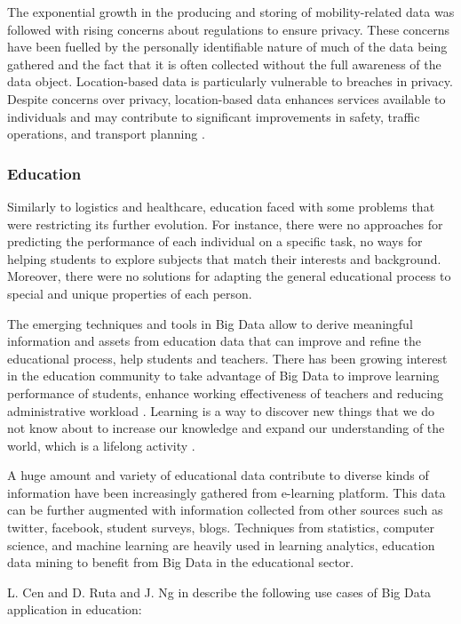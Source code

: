 \documentclass[runningheads]{llncs}
\begin{document}
The exponential growth in the producing and storing of mobility-related data was followed with rising concerns about regulations to ensure privacy. These concerns have been fuelled by the personally identifiable nature of much of the data being gathered and the fact that it is often collected without the full awareness of the data object. Location-based data is particularly vulnerable to breaches in privacy. Despite concerns over privacy, location-based data enhances services available to individuals and may contribute to significant improvements in safety, traffic operations, and transport planning \cite{TRANSPORT}. 

\subsubsection{Education}

Similarly to logistics and healthcare, education faced with some problems that were restricting its further evolution. For instance, there were no approaches for predicting the performance of each individual on a specific task, no ways for helping students to explore subjects that match their interests and background. Moreover, there were no solutions for adapting the general educational process to special and unique properties of each person. 

The emerging techniques and tools in Big Data allow to derive meaningful information and assets from education data that can improve and refine the educational process, help students and teachers. There has been growing interest in the education community to take advantage of Big Data to improve learning performance of
students, enhance working effectiveness of teachers and reducing administrative workload \cite{SHAMRZO}. Learning is a way to discover new things that we do not know about to increase our knowledge and expand our understanding of the world, which is a lifelong activity \cite{BIGEDUCATION}. 

A huge amount and variety of educational data contribute to diverse kinds of information have been increasingly gathered from e-learning platform. This data can be further augmented with information collected from other sources such as twitter, facebook, student surveys, blogs. Techniques from statistics, computer science, and machine learning are heavily used in learning analytics, education data mining to benefit from Big Data in the educational sector.

L. Cen and D. Ruta and J. Ng in \cite{EDUCATIONOPPORTUNITIES} describe the following use cases of Big Data application in education:
\end{document}
